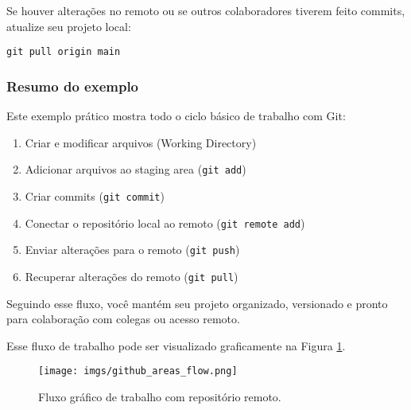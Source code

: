 Se houver alterações no remoto ou se outros colaboradores tiverem feito commits, atualize seu projeto local:

\begin{lstlisting}[style=shellstyle]
git pull origin main
\end{lstlisting}

\subsubsection*{Resumo do exemplo}

Este exemplo prático mostra todo o ciclo básico de trabalho com Git:

\begin{enumerate}
    \item Criar e modificar arquivos (Working Directory)
    \item Adicionar arquivos ao staging area (\texttt{git add})
    \item Criar commits (\texttt{git commit})
    \item Conectar o repositório local ao remoto (\texttt{git remote add})
    \item Enviar alterações para o remoto (\texttt{git push})
    \item Recuperar alterações do remoto (\texttt{git pull})
\end{enumerate}

Seguindo esse fluxo, você mantém seu projeto organizado, versionado e pronto para colaboração com colegas ou acesso remoto.

Esse fluxo de trabalho pode ser visualizado graficamente na Figura \ref{fig:github_areas_flow}.

\begin{figure}[H]
\centering
\texttt{[image: imgs/github\_areas\_flow.png]}
\caption{Fluxo gráfico de trabalho com repositório remoto.}
\label{fig:github_areas_flow}
\end{figure}